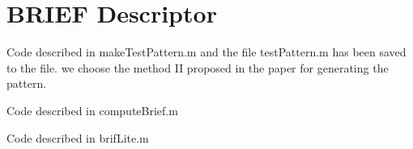 \documentclass[12pt]{article}
\newenvironment{problem}[2][Problem]{\begin{trivlist}
\item[\hskip \labelsep {\bfseries #1}\hskip \labelsep {\bfseries #2.}]}{\end{trivlist}}
\begin{document}
\newpage
\section{BRIEF Descriptor}

\begin{problem}{2.1}
Code described in makeTestPattern.m and the file testPattern.m has been saved to the file. we choose the method II proposed in the paper for generating the pattern.\\ 
\end{problem}

\begin{problem}{2.2}
Code described in computeBrief.m\\ 
\end{problem}

\begin{problem}{2.3}
Code described in brifLite.m\\ 
\end{problem}
\end{document}
